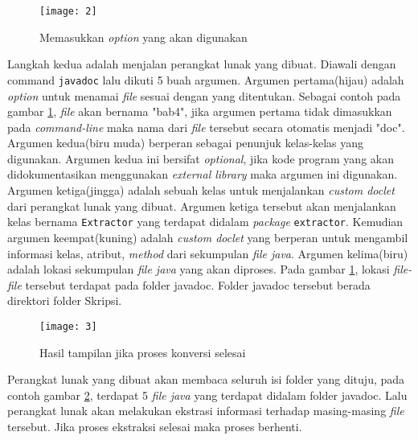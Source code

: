 \begin{figure}[H]
	\centering  
	\texttt{[image: 2]}  
	\caption[]{Memasukkan {\it option} yang akan digunakan} 
	\label{fig:2} 
\end{figure}
Langkah kedua adalah menjalan perangkat lunak yang dibuat. Diawali dengan command \texttt{javadoc} lalu dikuti 5 buah argumen. Argumen pertama(hijau) adalah {\it option} untuk menamai {\it file} sesuai dengan yang ditentukan. Sebagai contoh pada gambar \ref{fig:2}, {\it file} akan bernama "bab4", jika argumen pertama tidak dimasukkan pada {\it command-line} maka nama dari {\it file} tersebut secara otomatis menjadi "doc". Argumen kedua(biru muda) berperan sebagai penunjuk kelas-kelas yang digunakan. Argumen kedua ini bersifat {\it optional}, jika kode program yang akan didokumentasikan menggunakan {\it external library} maka argumen ini digunakan. Argumen ketiga(jingga) adalah sebuah kelas untuk menjalankan {\it custom doclet} dari perangkat lunak yang dibuat. Argumen ketiga tersebut akan menjalankan kelas bernama \texttt{Extractor} yang terdapat didalam {\it package} \texttt{extractor}. Kemudian argumen keempat(kuning) adalah {\it custom doclet} yang berperan untuk mengambil informasi kelas, atribut, {\it method} dari sekumpulan {\it file java}. Argumen kelima(biru) adalah lokasi sekumpulan {\it file java} yang akan diproses. Pada gambar \ref{fig:2}, lokasi {\it file-file} tersebut terdapat pada folder javadoc. Folder javadoc tersebut berada direktori folder Skripsi.

\begin{figure}[H]
	\centering  
	\texttt{[image: 3]}  
	\caption[]{Hasil tampilan jika proses konversi selesai} 
	\label{fig:3} 
\end{figure}
Perangkat lunak yang dibuat akan membaca seluruh isi folder yang dituju, pada contoh gambar \ref{fig:3}, terdapat 5 {\it file java} yang terdapat didalam folder javadoc. Lalu perangkat lunak akan melakukan ekstrasi informasi terhadap masing-masing {\it file} tersebut. Jika proses ekstraksi selesai maka proses berhenti.
























